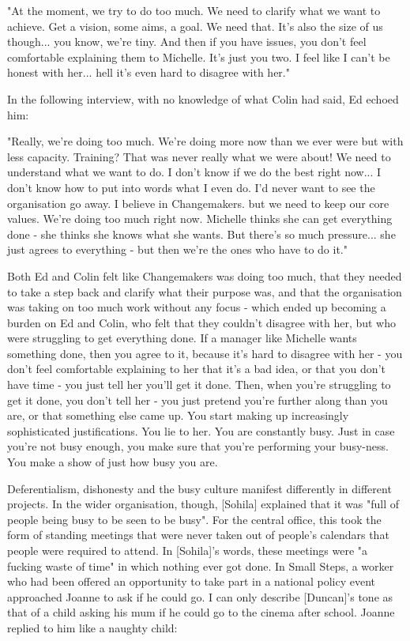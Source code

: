 "At the moment, we try to do too much. We need to clarify what we want to achieve. Get a vision, some aims, a goal. We need that. It's also the size of us though... you know, we're tiny. And then if you have issues, you don't feel comfortable explaining them to Michelle. It's just you two. I feel like I can't be honest with her... hell it's even hard to disagree with her."

In the following interview, with no knowledge of what Colin had said, Ed echoed him:

"Really, we're doing too much. We're doing more now than we ever were but with less capacity. Training? That was never really what we were about! We need to understand what we want to do. I don't know if we do the best right now... I don't know how to put into words what I even do. I'd never want to see the organisation go away. I believe in Changemakers. but we need to keep our core values. We're doing too much right now. Michelle thinks she can get everything done - she thinks she knows what she wants. But there's so much pressure... she just agrees to everything - but then we're the ones who have to do it."

Both Ed and Colin felt like Changemakers was doing too much, that they needed to take a step back and clarify what their purpose was, and that the organisation was taking on too much work without any focus - which ended up becoming a burden on Ed and Colin, who felt that they couldn't disagree with her, but who were struggling to get everything done. If a manager like Michelle wants something done, then you agree to it, because it's hard to disagree with her - you don't feel comfortable explaining to her that it's a bad idea, or that you don't have time - you just tell her you'll get it done. Then, when you're struggling to get it done, you don't tell her - you just pretend you're further along than you are, or that something else came up. You start making up increasingly sophisticated justifications. You lie to her. You are constantly busy. Just in case you're not busy enough, you make sure that you're performing your busy-ness. You make a show of just how busy you are.

Deferentialism, dishonesty and the busy culture manifest differently in different projects. In the wider organisation, though, [Sohila] explained that it was "full of people being busy to be seen to be busy". For the central office, this took the form of standing meetings that were never taken out of people's calendars that people were required to attend. In [Sohila]'s words, these meetings were "a fucking waste of time" in which nothing ever got done. In Small Steps, a worker who had been offered an opportunity to take part in a national policy event approached Joanne to ask if he could go. I can only describe [Duncan]'s tone as that of a child asking his mum if he could go to the cinema after school. Joanne replied to him like a naughty child:

